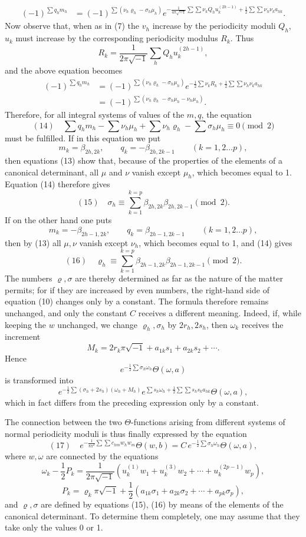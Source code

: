 \documentclass[10pt]{article}
\begin{document}
\[
\begin{aligned}
(-1)^{\sum q_hm_h}
&=(-1)^{\sum(\nu_h\varrho_h-\sigma_h\mu_h)}
e^{-\frac{1}{4\pi\sqrt{-1}}\sum\sum\nu_kQ_hu_k^{(2h-1)}
+\frac12\sum\sum\nu_h\nu_ka_{hk}}.
\end{aligned}
\]
Now observe that, when as in (7) the \(v_h\) increase by the periodicity moduli \(Q_h\), \(u_k\) must increase by the corresponding periodicity modulus \(R_k\). Thus
\[
R_k=\frac{1}{2\pi\sqrt{-1}}\sum_h Q_hu_k^{(2h-1)},
\]
and the above equation becomes
\[
\begin{aligned}
(-1)^{\sum q_hm_h}
&=(-1)^{\sum(\nu_h\varrho_h-\sigma_h\mu_h)}
e^{-\frac12\sum\nu_kR_k+\frac12\sum\sum\nu_h\nu_ka_{hk}}\\
&=(-1)^{\sum(\nu_h\varrho_h-\sigma_h\mu_h-\nu_h\mu_h)}.
\end{aligned}
\]
Therefore, for all integral systems of values of the \(m,q\), the equation
\[
(14)\quad
\sum q_hm_h-\sum\nu_h\mu_h+\sum\nu_h\varrho_h-\sum\sigma_h\mu_h
\equiv0 \pmod{2}
\]
must be fulfilled. If in this equation we put
\[
m_k=\beta_{2h,2k},\qquad q_k=-\beta_{2h,2k-1}\qquad (k=1,2\ldots p),
\]
then equations (13) show that, because of the properties of the elements of a canonical determinant, all \(\mu\) and \(\nu\) vanish except \(\mu_h\), which becomes equal to 1. Equation (14) therefore gives
\[
(15)\quad
\sigma_h\equiv\sum_{k=1}^{k=p}\beta_{2h,2k}\beta_{2h,2k-1}\pmod{2}.
\]
If on the other hand one puts
\[
m_k=-\beta_{2h-1,2k},\qquad q_k=\beta_{2h-1,2k-1}\qquad (k=1,2\ldots p),
\]
then by (13) all \(\mu,\nu\) vanish except \(\nu_h\), which becomes equal to 1, and (14) gives
\[
(16)\quad
\varrho_h\equiv\sum_{k=1}^{k=p}\beta_{2h-1,2k}\beta_{2h-1,2k-1}\pmod{2}.
\]
The numbers \(\varrho,\sigma\) are thereby determined as far as the nature of the matter permits; for if they are increased by even numbers, the right-hand side of equation (10) changes only by a constant. The formula therefore remains unchanged, and only the constant \(C\) receives a different meaning. Indeed, if, while keeping the \(w\) unchanged, we change \(\varrho_h,\sigma_h\) by \(2r_h,2s_h\), then \(\omega_k\) receives the increment
\[
M_k=2r_k\pi\sqrt{-1}+a_{1k}s_1+a_{2k}s_2+\cdots .
\]
Hence
\[
e^{-\frac12\sum\sigma_h\omega_h}\Theta(\omega,a)
\]
is transformed into
\[
e^{-\frac12\sum(\sigma_h+2s_h)(\omega_h+M_h)}
e^{\sum s_h\omega_h+\frac12\sum\sum s_hs_ka_{hk}}\Theta(\omega,a),
\]
which in fact differs from the preceding expression only by a constant.

The connection between the two \(\Theta\)-functions arising from different systems of normal periodicity moduli is thus finally expressed by the equation
\[
(17)\quad
e^{-\frac{1}{8\pi^2}\sum\sum c_{hm}w_hw_m}\Theta(w,b)
=
C\,e^{-\frac12\sum\sigma_h\omega_h}\Theta(\omega,a),
\]
where \(w,\omega\) are connected by the equations
\[
\omega_k-\frac12P_k=
\frac{1}{2\pi\sqrt{-1}}
\left(u_k^{(1)}w_1+u_k^{(3)}w_2+\cdots+u_k^{(2p-1)}w_p\right),
\]
\[
P_k=\varrho_k\pi\sqrt{-1}+\frac12(a_{1k}\sigma_1+a_{2k}\sigma_2+\cdots+a_{pk}\sigma_p),
\]
and \(\varrho,\sigma\) are defined by equations (15), (16) by means of the elements of the canonical determinant. To determine them completely, one may assume that they take only the values 0 or 1.
\end{document}
